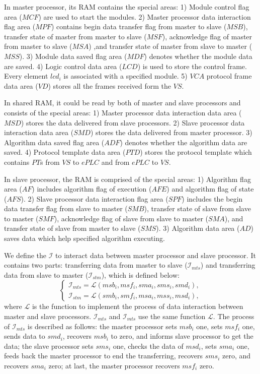 \documentclass[journal,UTF8]{IEEEtran}
\begin{document}
In master processor, its RAM contains the special areas: 1) Module control flag area ($MCF$) are used to start the modules. 2) Master processor data interaction flag area ($MPF$) contains begin data transfer flag from master to slave ($MSB$), transfer state of master from master to slave ($MSF$), acknowledge flag of master from master to slave ($MSA$) ,and transfer state of master from slave to master ($MSS$). 3) Module data saved flag area ($MDF$) denotes whether the module data are saved. 4) Logic control data area ($LCD$) is used to store the control frame. Every element $lcd_i$ is associated with a specified module. 5) $VCA$ protocol frame data area ($VD$) stores all the frames received form the $VS$.  

In shared RAM, it could be read by both of master and slave processors and consists of the special areas: 1) Master processor data interaction data area ($MSD$) stores the data delivered from slave processors. 2) Slave processor data interaction data area ($SMD$) stores the data delivered from master processor. 3) Algorithm data saved flag area ($ADF$) denotes whether the algorithm data are saved. 4) Protocol template data area ($PTD$) stores the protocol template which contains $PT$s from $VS$ to $ePLC$ and from $ePLC$ to $VS$.


In slave processor, the RAM is comprised of the special areas: 1) Algorithm flag area ($AF$) includes algorithm flag of execution ($AFE$) and algorithm flag of state ($AFS$). 2) Slave processor data interaction flag area ($SPF$) includes the begin data transfer flag from slave to master ($SMB$), transfer state of slave from slave to master ($SMF$), acknowledge flag of slave from slave to master ($SMA$), and transfer state of slave from master to slave ($SMS$). 3) Algorithm data area ($AD$) saves data which help specified algorithm executing.

 We define the $\mathcal{I}$ to interact data between master processor and slave processor. It contains two parts: transferring data from master to slave ($\mathcal{I}_{mts}$) and transferring data from slave to master ($\mathcal{I}_{stm}$), which is defined below:
 \begin{equation}
 \left\{
 \begin{array}{l}
 \mathcal{I}_{mts} = \mathcal{L} (msb_i,msf_i,sma_i,sms_i,smd_i),\\
 \mathcal{I}_{stm} = \mathcal{L} (smb_i,smf_i,msa_i,mss_i,msd_i),
 \end{array}
 \right.
 \end{equation}
 where $\mathcal{L}$ is the function to implement the process of data interaction between master and slave processors. $\mathcal{I}_{mts}$ and $\mathcal{I}_{mts}$ use the same function $\mathcal{L}$. The process of $\mathcal{I}_{mts}$ is described as follows: the master processor sets $msb_i$ one, sets $msf_i$ one, sends data to $smd_i$, recovers $msb_i$ to zero, and informs slave processor to get the data; the slave processor sets $sms_i$ one, checks the data of $msd_i$, sets $sma_i$ one, feeds back the master processor to end the transferring, recovers $sms_i$ zero, and recovers $sma_i$ zero; at last, the master processor recovers $msf_i$ zero.     
 
\end{document}
